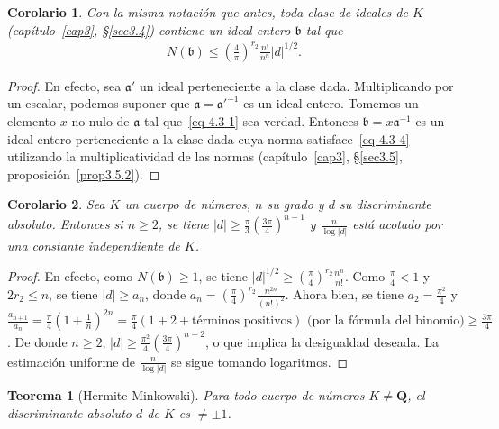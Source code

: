 \documentclass[oneside,bibtotoc,leqno,spanish]{amsbook}
\newcommand{\QQ}{\mathbf{Q}}
\newcommand{\idl}[1]{\mathfrak{#1}}
\newcommand{\abs}[1]{\left\lvert#1\right\rvert}
\numberwithin{equation}{section}
\theoremstyle{defi}
\theoremstyle{note}
\newtheorem{theorem}{Teorema}
\newtheorem{corollary}{Corolario}
\theoremstyle{rem}
\numberwithin{theorem}{section}
\numberwithin{proposition}{section}
\numberwithin{definition}{section}
\numberwithin{lemma}{section}
\numberwithin{corollary}{section}
\numberwithin{example}{section}
\numberwithin{footnote}{section}%
\begin{document}
\begin{corollary}\label{cor4.3.1}
Con la misma notaci\'on que antes, toda clase de ideales de $K$ (cap\'itulo~\ref{cap3}, \S\ref{sec3.4})
contiene un ideal entero $\idl{b}$ tal que
\begin{gather}\label{eq-4.3-4}
N(\idl{b})\leq\left(\frac{4}{\pi}\right)^{r_{2}}\frac{n!}{n^{n}}\abs{d}^{1/2}.
\end{gather}
\end{corollary}

\begin{proof}
En efecto, sea $\idl{a}'$ un ideal perteneciente a la clase dada. Multiplicando por un escalar, podemos suponer
que $\idl{a} = \idl{a}'^{-1}$ es un ideal entero. Tomemos un elemento $x$ no nulo de $\idl{a}$ tal que~\eqref{eq-4.3-1}
sea verdad. Entonces $\idl{b} = x\idl{a}^{-1}$ es un ideal entero perteneciente a la clase dada cuya norma
satisface~\eqref{eq-4.3-4} utilizando la multiplicatividad de las normas (cap\'itulo~\ref{cap3}, \S\ref{sec3.5},
proposici\'on~\ref{prop3.5.2}).
\end{proof}

\begin{corollary}\label{cor4.3.2}
Sea $K$ un cuerpo de n\'umeros, $n$ su grado y $d$ su discriminante absoluto. Entonces si $n\geq 2$, se tiene
$\abs{d}\geq\frac{\pi}{3}\left(\frac{3\pi}{4}\right)^{n-1}$ y $\frac{n}{\log\abs{d}}$ est\'a acotado por una
constante independiente de $K$.
\end{corollary}

\begin{proof}
En efecto, como $N(\idl{b})\geq 1$, se tiene $\abs{d}^{1/2}\geq\left(\frac{\pi}{4}\right)^{r_{2}}\frac{n^{n}}{n!}$.
Como $\frac{\pi}{4} < 1$ y $2r_{2}\leq n$, se tiene $\abs{d}\geq a_{n}$, donde
$a_{n} = \left(\frac{\pi}{4}\right)^{r_{2}}\frac{n^{2n}}{(n!)^{2}}$. Ahora bien, se tiene $a_{2} = \frac{\pi^{2}}{4}$
y $\frac{a_{n+1}}{a_{n}} = \frac{\pi}{4}\left(1+\frac{1}{n}\right)^{2n} = \frac{\pi}{4}(1+2+\text{t\'erminos positivos})
\text{ (por la f\'ormula del binomio)} \geq \frac{3\pi}{4}$. De donde $n\geq 2$,
$\abs{d}\geq\frac{\pi^{2}}{4}\left(\frac{3\pi}{4}\right)^{n-2}$,
o que implica la desigualdad deseada. La estimaci\'on uniforme de $\frac{n}{\log\abs{d}}$ se sigue tomando logaritmos.
\end{proof}

\begin{theorem}[Hermite-Minkowski]
Para todo cuerpo de n\'umeros $K\neq\QQ$, el discriminante absoluto $d$ de $K$ es $\neq\pm 1$.
\end{theorem}
\end{document}

